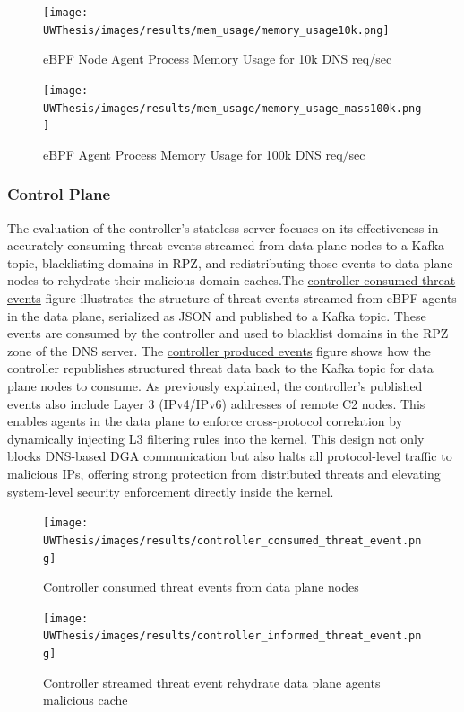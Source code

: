 \documentclass [11pt, proquest] {uwthesis}[2020/02/24]
\begin{document}
\begin{figure}[H]
  \centering
  \begin{minipage}[b]{0.48\textwidth}
    \centering
    \texttt{[image: UWThesis/images/results/mem\_usage/memory\_usage10k.png]}
    \caption{eBPF Node Agent Process Memory Usage for 10k DNS req/sec}
    \label{fig:mem10k}
  \end{minipage}
  \hfill
  \begin{minipage}[b]{0.48\textwidth}
    \centering
    \texttt{[image: UWThesis/images/results/mem\_usage/memory\_usage\_mass100k.png]}
    \caption{eBPF Agent Process Memory Usage for 100k DNS req/sec}
    \label{fig:mem100k}
  \end{minipage}
\end{figure}


\subsubsection{Control Plane}
The evaluation of the controller’s stateless server focuses on its effectiveness in accurately consuming threat events streamed from data plane nodes to a Kafka topic, blacklisting domains in RPZ, and redistributing those events to data plane nodes to rehydrate their malicious domain caches.The \hyperref[fig:controller_metric]{controller consumed threat events} figure illustrates the structure of threat events streamed from eBPF agents in the data plane, serialized as JSON and published to a Kafka topic. These events are consumed by the controller and used to blacklist domains in the RPZ zone of the DNS server. The \hyperref[fig:controller_aware_metric]{controller produced events} figure shows how the controller republishes structured threat data back to the Kafka topic for data plane nodes to consume. As previously explained, the controller’s published events also include Layer 3 (IPv4/IPv6) addresses of remote C2 nodes. This enables agents in the data plane to enforce cross-protocol correlation by dynamically injecting L3 filtering rules into the kernel. This design not only blocks DNS-based DGA communication but also halts all protocol-level traffic to malicious IPs, offering strong protection from distributed threats and elevating system-level security enforcement directly inside the kernel.


\begin{figure}[H]
  \centering
  \begin{minipage}[t]{0.47\textwidth}
    \centering
    \texttt{[image: UWThesis/images/results/controller\_consumed\_threat\_event.png]}
\caption{Controller consumed threat events from data plane nodes}
  \label{fig:controller_metric}
  \end{minipage}
  \hfill
  \begin{minipage}[t]{0.47\textwidth}
    \centering
    \texttt{[image: UWThesis/images/results/controller\_informed\_threat\_event.png]}
    \caption{Controller streamed threat event rehydrate data plane agents malicious cache}
     \label{fig:controller_aware_metric}
  \end{minipage}
\end{figure}
\end{document}
